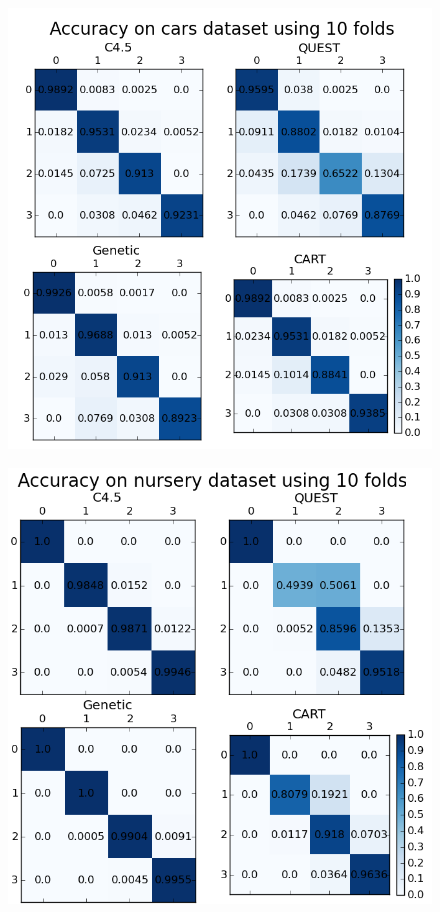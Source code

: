 \documentclass[english]{beamer}
\begin{document}
{
\begin{frame}{}
	\vspace{-0.75em}
	\begin{figure}
		\centering
		\includegraphics[scale=0.42]{figures/genetic_cars_10_folds.png}
	\end{figure}
\end{frame} }

{
	\begin{frame}{}
		\vspace{-0.5em}
		\begin{figure}
			\centering
			\includegraphics[scale=0.42]{figures/genetic_nurse_10_folds.png}
		\end{figure}
	\end{frame} }
\end{document}

